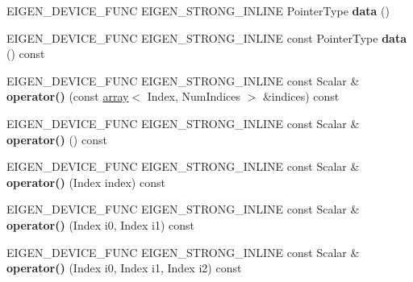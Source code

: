 \begin{DoxyCompactItemize}
\item 
\mbox{\label{class_eigen_1_1_tensor_map_a7f70d6785756de46ed4fd5ba9afc5dd7}} 
E\+I\+G\+E\+N\+\_\+\+D\+E\+V\+I\+C\+E\+\_\+\+F\+U\+NC E\+I\+G\+E\+N\+\_\+\+S\+T\+R\+O\+N\+G\+\_\+\+I\+N\+L\+I\+NE Pointer\+Type {\bfseries data} ()
\item 
\mbox{\label{class_eigen_1_1_tensor_map_aec1b7d600b4a9a6588b1a0a00a63b135}} 
E\+I\+G\+E\+N\+\_\+\+D\+E\+V\+I\+C\+E\+\_\+\+F\+U\+NC E\+I\+G\+E\+N\+\_\+\+S\+T\+R\+O\+N\+G\+\_\+\+I\+N\+L\+I\+NE const Pointer\+Type {\bfseries data} () const
\item 
\mbox{\label{class_eigen_1_1_tensor_map_a84de83b9ed853382c8b6e1a92f1d6771}} 
E\+I\+G\+E\+N\+\_\+\+D\+E\+V\+I\+C\+E\+\_\+\+F\+U\+NC E\+I\+G\+E\+N\+\_\+\+S\+T\+R\+O\+N\+G\+\_\+\+I\+N\+L\+I\+NE const Scalar \& {\bfseries operator()} (const \hyperlink{class_eigen_1_1array}{array}$<$ Index, Num\+Indices $>$ \&indices) const
\item 
\mbox{\label{class_eigen_1_1_tensor_map_a87d1135393db607c950c3f01832c7f93}} 
E\+I\+G\+E\+N\+\_\+\+D\+E\+V\+I\+C\+E\+\_\+\+F\+U\+NC E\+I\+G\+E\+N\+\_\+\+S\+T\+R\+O\+N\+G\+\_\+\+I\+N\+L\+I\+NE const Scalar \& {\bfseries operator()} () const
\item 
\mbox{\label{class_eigen_1_1_tensor_map_ae0881920d6de72e7d3a65300a0dd0316}} 
E\+I\+G\+E\+N\+\_\+\+D\+E\+V\+I\+C\+E\+\_\+\+F\+U\+NC E\+I\+G\+E\+N\+\_\+\+S\+T\+R\+O\+N\+G\+\_\+\+I\+N\+L\+I\+NE const Scalar \& {\bfseries operator()} (Index index) const
\item 
\mbox{\label{class_eigen_1_1_tensor_map_a38ebb1946f395db585b8ecef8939f534}} 
E\+I\+G\+E\+N\+\_\+\+D\+E\+V\+I\+C\+E\+\_\+\+F\+U\+NC E\+I\+G\+E\+N\+\_\+\+S\+T\+R\+O\+N\+G\+\_\+\+I\+N\+L\+I\+NE const Scalar \& {\bfseries operator()} (Index i0, Index i1) const
\item 
\mbox{\label{class_eigen_1_1_tensor_map_a3981b3e9ba734768f17e3aa9d92631f9}} 
E\+I\+G\+E\+N\+\_\+\+D\+E\+V\+I\+C\+E\+\_\+\+F\+U\+NC E\+I\+G\+E\+N\+\_\+\+S\+T\+R\+O\+N\+G\+\_\+\+I\+N\+L\+I\+NE const Scalar \& {\bfseries operator()} (Index i0, Index i1, Index i2) const

\end{DoxyCompactItemize}
